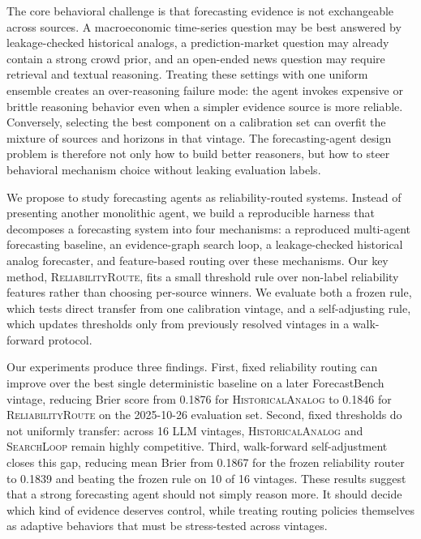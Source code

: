 \documentclass{article}
\newcommand{\rel}{\textsc{ReliabilityRoute}}
\newcommand{\hist}{\textsc{HistoricalAnalog}}
\newcommand{\search}{\textsc{SearchLoop}}
\begin{document}
The core behavioral challenge is that forecasting evidence is not exchangeable across sources. A macroeconomic time-series question may be best answered by leakage-checked historical analogs, a prediction-market question may already contain a strong crowd prior, and an open-ended news question may require retrieval and textual reasoning. Treating these settings with one uniform ensemble creates an over-reasoning failure mode: the agent invokes expensive or brittle reasoning behavior even when a simpler evidence source is more reliable. Conversely, selecting the best component on a calibration set can overfit the mixture of sources and horizons in that vintage. The forecasting-agent design problem is therefore not only how to build better reasoners, but how to steer behavioral mechanism choice without leaking evaluation labels.

We propose to study forecasting agents as reliability-routed systems. Instead of presenting another monolithic agent, we build a reproducible harness that decomposes a forecasting system into four mechanisms: a reproduced multi-agent forecasting baseline, an evidence-graph search loop, a leakage-checked historical analog forecaster, and feature-based routing over these mechanisms. Our key method, \rel{}, fits a small threshold rule over non-label reliability features rather than choosing per-source winners. We evaluate both a frozen rule, which tests direct transfer from one calibration vintage, and a self-adjusting rule, which updates thresholds only from previously resolved vintages in a walk-forward protocol.

Our experiments produce three findings. First, fixed reliability routing can improve over the best single deterministic baseline on a later ForecastBench vintage, reducing Brier score from 0.1876 for \hist{} to 0.1846 for \rel{} on the 2025-10-26 evaluation set. Second, fixed thresholds do not uniformly transfer: across 16 LLM vintages, \hist{} and \search{} remain highly competitive. Third, walk-forward self-adjustment closes this gap, reducing mean Brier from 0.1867 for the frozen reliability router to 0.1839 and beating the frozen rule on 10 of 16 vintages. These results suggest that a strong forecasting agent should not simply reason more. It should decide which kind of evidence deserves control, while treating routing policies themselves as adaptive behaviors that must be stress-tested across vintages.
\end{document}
